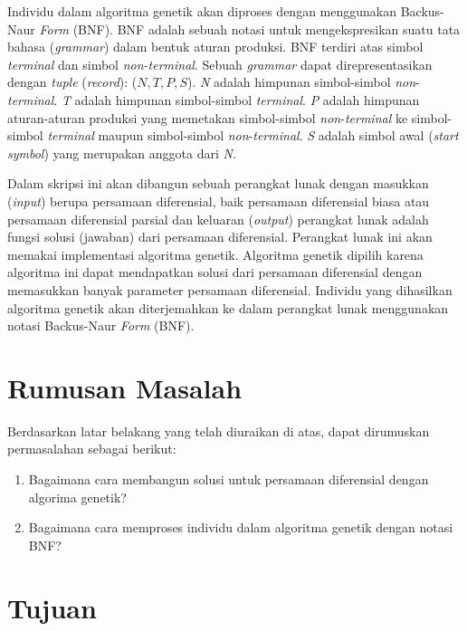 Individu dalam algoritma genetik akan diproses dengan menggunakan Backus-Naur \textit{Form} (BNF). BNF adalah sebuah notasi untuk mengekspresikan suatu tata bahasa (\textit{grammar}) dalam bentuk aturan produksi. BNF terdiri atas simbol \textit{terminal} dan simbol \textit{non-terminal}. Sebuah \textit{grammar} dapat direpresentasikan dengan \textit{tuple} (\textit{record}): (\begin{math} {N, T, P, S} \end{math}). \textit{N} adalah himpunan simbol-simbol \textit{non}-\textit{terminal}. \textit{T} adalah himpunan simbol-simbol \textit{terminal}. \textit{P} adalah himpunan aturan-aturan produksi yang memetakan simbol-simbol \textit{non}-\textit{terminal} ke simbol-simbol \textit{terminal} maupun simbol-simbol \textit{non}-\textit{terminal}. \textit{S} adalah simbol awal (\textit{start symbol}) yang merupakan anggota dari \textit{N}.

Dalam skripsi ini akan dibangun sebuah perangkat lunak dengan masukkan (\textit{input}) berupa persamaan diferensial, baik persamaan diferensial biasa atau persamaan diferensial parsial dan keluaran (\textit{output}) perangkat lunak adalah fungsi solusi (jawaban) dari persamaan diferensial. Perangkat lunak ini akan memakai implementasi algoritma genetik. Algoritma genetik dipilih karena algoritma ini dapat mendapatkan solusi dari persamaan diferensial dengan memasukkan banyak parameter persamaan diferensial. Individu yang dihasilkan algoritma genetik  akan diterjemahkan ke dalam perangkat lunak menggunakan notasi Backus-Naur \textit{Form} (BNF).

\section{Rumusan Masalah}
\label{sec:rumusan}

Berdasarkan latar belakang yang telah diuraikan di atas, dapat dirumuskan permasalahan sebagai berikut:

\begin{enumerate}

	\item Bagaimana cara membangun solusi untuk persamaan diferensial dengan algorima genetik?
	\item Bagaimana cara memproses individu dalam algoritma genetik dengan notasi BNF?

\end{enumerate}

\section{Tujuan}
\label{sec:tujuan}

